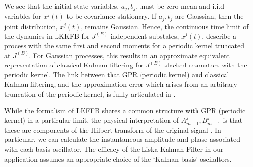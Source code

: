 We see that the initial state variables, $a_j, b_j$, must be zero mean and i.i.d. variables for $x^j(t)$ to be covariance stationary. If $a_j, b_j$ are Gaussian, then the joint distribution, $x^j(t)$, remains Gaussian. Hence, the continuous time limit of the dynamics in LKKFB for $J^{(B)}$  independent substates, $x^j(t)$, describe a process with the same first and second moments for a periodic kernel truncated at $J^{(B)}$. For Gaussian processes, this results in an approximate equivalent representation of classical Kalman filtering for $J^{(B)}$ stacked resonators with the periodic kernel. The link between that GPR (periodic kernel) and classical Kalman filtering, and the approximation error which arises from an arbitrary truncation of the periodic kernel, is fullly articulated in \cite{solin2014explicit}. 

While the formalism of LKFFB shares a common structure with GPR (periodic kernel) in a particular limit, the  physical interpretation of $A^j_{m-1}, B^j_{m-1}$ is that these are components of the Hilbert transform of the original signal \cite{livska2007}. In particular, we can calculate the instantaneous amplitude and phase associated with each basis oscillator. The efficacy of the Liska Kalman Filter in our application assumes an appropriate choice of the `Kalman basis' oscilaltors. 

